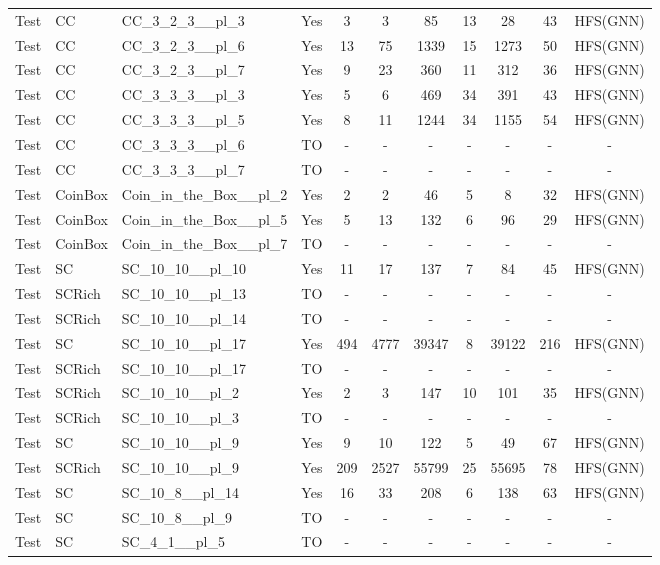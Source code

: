 \documentclass{article}
\begin{document}
\begin{tabular}{lllcccccccc}
Test & CC & CC\_3\_2\_3\_\_pl\_3 & Yes & 3 & 3 & 85 & 13 & 28 & 43 & HFS(GNN) \\
Test & CC & CC\_3\_2\_3\_\_pl\_6 & Yes & 13 & 75 & 1339 & 15 & 1273 & 50 & HFS(GNN) \\
Test & CC & CC\_3\_2\_3\_\_pl\_7 & Yes & 9 & 23 & 360 & 11 & 312 & 36 & HFS(GNN) \\
Test & CC & CC\_3\_3\_3\_\_pl\_3 & Yes & 5 & 6 & 469 & 34 & 391 & 43 & HFS(GNN) \\
Test & CC & CC\_3\_3\_3\_\_pl\_5 & Yes & 8 & 11 & 1244 & 34 & 1155 & 54 & HFS(GNN) \\
Test & CC & CC\_3\_3\_3\_\_pl\_6 & TO & - & - & - & - & - & - & - \\
Test & CC & CC\_3\_3\_3\_\_pl\_7 & TO & - & - & - & - & - & - & - \\
Test & CoinBox & Coin\_in\_the\_Box\_\_pl\_2 & Yes & 2 & 2 & 46 & 5 & 8 & 32 & HFS(GNN) \\
Test & CoinBox & Coin\_in\_the\_Box\_\_pl\_5 & Yes & 5 & 13 & 132 & 6 & 96 & 29 & HFS(GNN) \\
Test & CoinBox & Coin\_in\_the\_Box\_\_pl\_7 & TO & - & - & - & - & - & - & - \\
Test & SC & SC\_10\_10\_\_pl\_10 & Yes & 11 & 17 & 137 & 7 & 84 & 45 & HFS(GNN) \\
Test & SCRich & SC\_10\_10\_\_pl\_13 & TO & - & - & - & - & - & - & - \\
Test & SCRich & SC\_10\_10\_\_pl\_14 & TO & - & - & - & - & - & - & - \\
Test & SC & SC\_10\_10\_\_pl\_17 & Yes & 494 & 4777 & 39347 & 8 & 39122 & 216 & HFS(GNN) \\
Test & SCRich & SC\_10\_10\_\_pl\_17 & TO & - & - & - & - & - & - & - \\
Test & SCRich & SC\_10\_10\_\_pl\_2 & Yes & 2 & 3 & 147 & 10 & 101 & 35 & HFS(GNN) \\
Test & SCRich & SC\_10\_10\_\_pl\_3 & TO & - & - & - & - & - & - & - \\
Test & SC & SC\_10\_10\_\_pl\_9 & Yes & 9 & 10 & 122 & 5 & 49 & 67 & HFS(GNN) \\
Test & SCRich & SC\_10\_10\_\_pl\_9 & Yes & 209 & 2527 & 55799 & 25 & 55695 & 78 & HFS(GNN) \\
Test & SC & SC\_10\_8\_\_pl\_14 & Yes & 16 & 33 & 208 & 6 & 138 & 63 & HFS(GNN) \\
Test & SC & SC\_10\_8\_\_pl\_9 & TO & - & - & - & - & - & - & - \\
Test & SC & SC\_4\_1\_\_pl\_5 & TO & - & - & - & - & - & - & - \\

\end{tabular}
\end{document}
